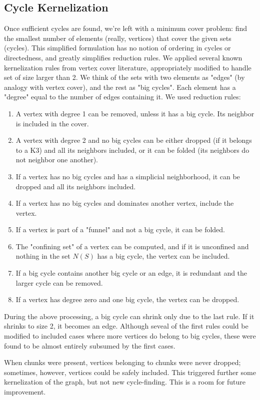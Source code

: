 \documentclass[a4paper,11pt]{article}
\newcommand{\9}{\,\,\,\,\,\,\,\,\,}
\begin{document}
\subsection{Cycle Kernelization}
Once sufficient cycles are found, we're left with a minimum cover problem: find the smallest number of elements (really, vertices) that cover the given sets (cycles). This simplified formulation has no notion of ordering in cycles or directedness, and greatly simplifies reduction rules. We applied several known kernelization rules from vertex cover literature, appropriately modified to handle set of size larger than 2. We think of the sets with two elements as "edges" (by analogy with vertex cover), and the rest as "big cycles". Each element has a "degree" equal to the number of edges containing it. We used reduction rules:
\begin{enumerate}
\item A vertex with degree 1 can be removed, unless it has a big cycle. Its neighbor is included in the cover.
\item A vertex with degree 2 and no big cycles can be either dropped (if it belongs to a K3) and all its neighbors included, or it can be folded (its neighbors do not neighbor one another).
\item If a vertex has no big cycles and has a simplicial neighborhood, it can be dropped and all its neighbors included.
\item If a vertex has no big cycles and dominates another vertex, include the vertex.
\item If a vertex is part of a "funnel" and not a big cycle, it can be folded.
\item The "confining set" of a vertex can be computed, and if it is unconfined and nothing in the set $N(S)$ has a big cycle, the vertex can be included.
\item If a big cycle contains another big cycle or an edge, it is redundant and the larger cycle can be removed.
\item If a vertex has degree zero and one big cycle, the vertex can be dropped.
\end{enumerate}
During the above processing, a big cycle can shrink only due to the last rule. If it shrinks to size 2, it becomes an edge. Although seveal of the first rules could be modified to included cases where more vertices do belong to big cycles, these were found to be almost entirely subsumed by the first cases.

\par When chunks were present, vertices belonging to chunks were never dropped; sometimes, however, vertices could be safely included. This triggered further some kernelization of the graph, but not new cycle-finding. This is a room for future improvement.
\end{document}
